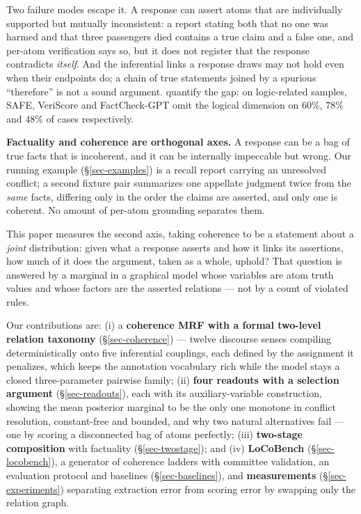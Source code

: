 \documentclass{article} %
\begin{document}
Two failure modes escape it. A response can assert atoms that are individually supported but
mutually inconsistent: a report stating both that no one was harmed and that three passengers
died contains a true claim and a false one, and per-atom verification says so, but it does not
register that the response contradicts \emph{itself}. And the inferential links a response
draws may not hold even when their endpoints do; a chain of true statements joined by a
spurious ``therefore'' is not a sound argument. \citet{lorefact} quantify the gap: on
logic-related samples, SAFE, VeriScore and FactCheck-GPT omit the logical dimension on
$60\%$, $78\%$ and $48\%$ of cases respectively.

\textbf{Factuality and coherence are orthogonal axes.} A response can be a bag of true facts
that is incoherent, and it can be internally impeccable but wrong. Our running example
(\S\ref{sec-examples}) is a recall report carrying an unresolved conflict; a second fixture
pair summarizes one appellate judgment twice from the \emph{same} facts, differing only in the
order the claims are asserted, and only one is coherent. No amount of per-atom grounding
separates them.

This paper measures the second axis, taking coherence to be a statement about a \emph{joint}
distribution: given what a response asserts and how it links its assertions, how much of it
does the argument, taken as a whole, uphold? That question is answered by a marginal in a
graphical model whose variables are atom truth values and whose factors are the asserted
relations --- not by a count of violated rules.

Our contributions are: (i) a \textbf{coherence MRF with a formal two-level relation taxonomy}
(\S\ref{sec-coherence}) --- twelve discourse senses compiling deterministically onto five
inferential couplings, each defined by the assignment it penalizes, which keeps the annotation
vocabulary rich while the model stays a closed three-parameter pairwise family; (ii) \textbf{four
readouts with a selection argument} (\S\ref{sec-readouts}), each with its auxiliary-variable
construction, showing the mean posterior marginal to be the only one monotone in conflict
resolution, constant-free and bounded, and why two natural alternatives fail --- one by scoring a
disconnected bag of atoms perfectly; (iii) \textbf{two-stage composition} with factuality
(\S\ref{sec-twostage}); and (iv) \textbf{LoCoBench} (\S\ref{sec-locobench}), a generator of
coherence ladders with committee validation, an evaluation protocol and baselines
(\S\ref{sec-baselines}), and \textbf{measurements} (\S\ref{sec-experiments}) separating
extraction error from scoring error by swapping only the relation graph.
\end{document}

